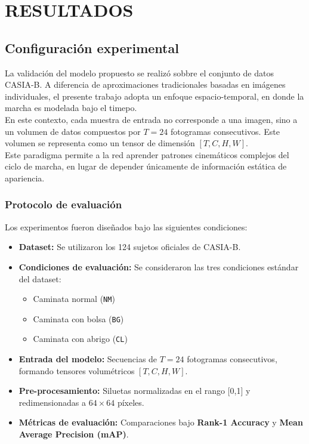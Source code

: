 \chapter{RESULTADOS}

\section{Configuración experimental}

La validación del modelo propuesto se realizó sobbre el conjunto de datos CASIA-B. A diferencia de aproximaciones tradicionales basadas en imágenes individuales, el presente trabajo adopta un enfoque espacio-temporal, en donde la marcha es modelada bajo el timepo. \\
En este contexto, cada muestra de entrada no corresponde a una imagen, sino a un volumen de datos compuestos por $T=24$ fotogramas consecutivos. Este volumen se representa como un tensor de dimensión $[T, C, H, W]$. \\
Este paradigma permite a la red aprender patrones cinemáticos complejos del ciclo de marcha, en lugar de depender únicamente de información estática de apariencia. 


\subsection{Protocolo de evaluación}

Los experimentos fueron diseñados bajo las siguientes condiciones:

\begin{itemize}
    \item \textbf{Dataset:} Se utilizaron los 124 sujetos oficiales de CASIA-B.
    
    \item \textbf{Condiciones de evaluación:} Se consideraron las tres condiciones estándar del dataset:
    \begin{itemize}
        \item Caminata normal (\texttt{NM})
        \item Caminata con bolsa (\texttt{BG})
        \item Caminata con abrigo (\texttt{CL})
    \end{itemize}
    
    \item \textbf{Entrada del modelo:} Secuencias de $T=24$ fotogramas consecutivos, formando tensores volumétricos $[T, C, H, W]$.
    
    \item \textbf{Pre-procesamiento:} Siluetas normalizadas en el rango [0,1] y redimensionadas a $64\times64$ píxeles.
    
    \item \textbf{Métricas de evaluación:} Comparaciones bajo \textbf{Rank-1 Accuracy} y \textbf{Mean Average Precision (mAP)}.
\end{itemize}

